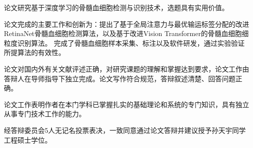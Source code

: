 
\begin{resolution}
    论文研究基于深度学习的骨髓血细胞检测与识别技术，选题具有实用价值。
    
    论文完成的主要工作和创新为：提出了基于全局注意力与最优输运标签分配的改进RetinaNet骨髓血细胞检测算法，以及基于改进Vision Transformer的骨髓血细胞细粒度识别算法。
    完成了骨髓血细胞样本采集、标注以及软件研发，通过实验验证所提算法的有效性。   

    论文对国内外有关文献评述正确，对研究课题的理解和掌握达到要求，论文工作由答辩人在导师指导下独立完成。论文写作符合规范，答辩叙述清楚、回答问题正确。

    论文工作表明作者在本门学科已掌握扎实的基础理论和系统的专门知识，具有独立从事专门技术工作的能力。

    经答辩委员会5人无记名投票表决，一致同意通过论文答辩并建议授予孙天宇同学工程硕士学位。
\end{resolution}
